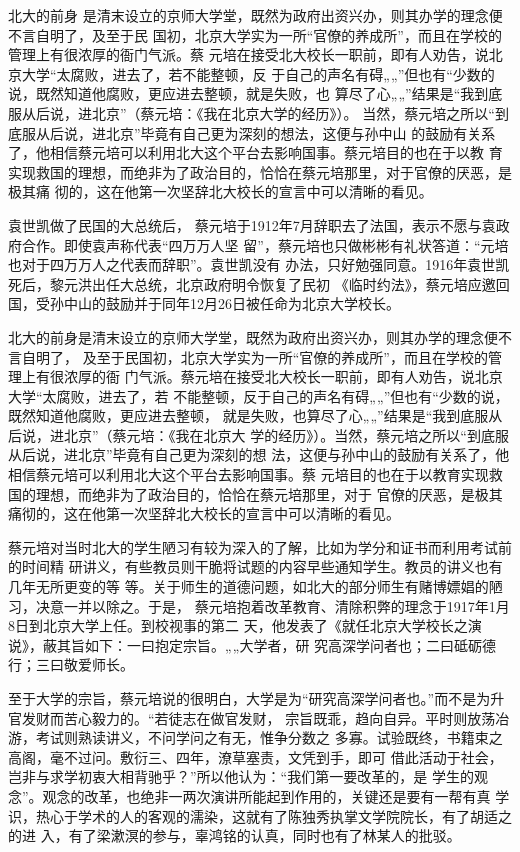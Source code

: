 \documentclass[11pt]{ctexart}
\begin{document}
{{{{北大的前身
是清末设立的京师大学堂，既然为政府出资兴办，则其办学的理念便不言自明了，及至于民
国初，北京大学实为一所“官僚的养成所”，而且在学校的管理上有很浓厚的衙门气派。蔡
元培在接受北大校长一职前，即有人劝告，说北京大学“太腐败，进去了，若不能整顿，反
于自己的声名有碍„„”但也有“少数的说，既然知道他腐败，更应进去整顿，就是失败，也
算尽了心„„”结果是“我到底服从后说，进北京”（蔡元培：《我在北京大学的经历》）。
当然，蔡元培之所以“到底服从后说，进北京”毕竟有自己更为深刻的想法，这便与孙中山
的鼓励有关系了，他相信蔡元培可以利用北大这个平台去影响国事。蔡元培目的也在于以教
育实现救国的理想，而绝非为了政治目的，恰恰在蔡元培那里，对于官僚的厌恶，是极其痛
彻的，这在他第一次坚辞北大校长的宣言中可以清晰的看见。

袁世凯做了民国的大总统后，
蔡元培于1912年7月辞职去了法国，表示不愿与袁政府合作。即使袁声称代表“四万万人坚
留”，蔡元培也只做彬彬有礼状答道：“元培也对于四万万人之代表而辞职”。袁世凯没有
办法，只好勉强同意。1916年袁世凯死后，黎元洪出任大总统，北京政府明令恢复了民初
《临时约法》，蔡元培应邀回国，受孙中山的鼓励并于同年12月26日被任命为北京大学校长。

北大的前身是清末设立的京师大学堂，既然为政府出资兴办，则其办学的理念便不言自明了，
及至于民国初，北京大学实为一所“官僚的养成所”，而且在学校的管理上有很浓厚的衙
门气派。蔡元培在接受北大校长一职前，即有人劝告，说北京大学“太腐败，进去了，若
不能整顿，反于自己的声名有碍„„”但也有“少数的说，既然知道他腐败，更应进去整顿，
就是失败，也算尽了心„„”结果是“我到底服从后说，进北京”（蔡元培：《我在北京大
学的经历》）。当然，蔡元培之所以“到底服从后说，进北京”毕竟有自己更为深刻的想
法，这便与孙中山的鼓励有关系了，他相信蔡元培可以利用北大这个平台去影响国事。蔡
元培目的也在于以教育实现救国的理想，而绝非为了政治目的，恰恰在蔡元培那里，对于
官僚的厌恶，是极其痛彻的，这在他第一次坚辞北大校长的宣言中可以清晰的看见。

蔡元培对当时北大的学生陋习有较为深入的了解，比如为学分和证书而利用考试前的时间精
研讲义，有些教员则干脆将试题的内容早些通知学生。教员的讲义也有几年无所更变的等
等。关于师生的道德问题，如北大的部分师生有赌博嫖娼的陋习，决意一并以除之。于是，
蔡元培抱着改革教育、清除积弊的理念于1917年1月8日到北京大学上任。到校视事的第二
天，他发表了《就任北京大学校长之演说》，蔽其旨如下：一曰抱定宗旨。„„大学者，研
究高深学问者也；二曰砥砺德行；三曰敬爱师长。

至于大学的宗旨，蔡元培说的很明白，大学是为“研究高深学问者也。”而不是为升官发财而苦心毅力的。“若徒志在做官发财，
宗旨既乖，趋向自异。平时则放荡冶游，考试则熟读讲义，不问学问之有无，惟争分数之
多寡。试验既终，书籍束之高阁，毫不过问。敷衍三、四年，潦草塞责，文凭到手，即可
借此活动于社会，岂非与求学初衷大相背驰乎？”所以他认为：“我们第一要改革的，是
学生的观念”。观念的改革，也绝非一两次演讲所能起到作用的，关键还是要有一帮有真
学识，热心于学术的人的客观的濡染，这就有了陈独秀执掌文学院院长，有了胡适之的进
入，有了梁漱溟的参与，辜鸿铭的认真，同时也有了林某人的批驳。

}}}}
\end{document}
